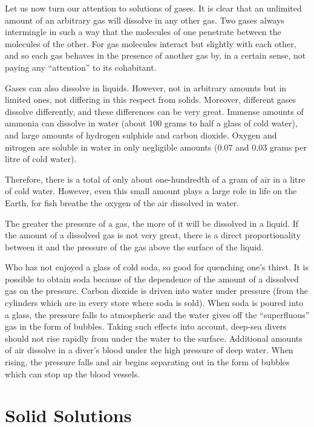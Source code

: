 Let us now turn our attention to solutions of gases. It is clear that an unlimited amount of an arbitrary gas will dissolve in any other gas. Two gases always intermingle in such a way that the molecules of one penetrate between the molecules of the other. For gas molecules interact but slightly with each other, and so each gas behaves in the presence of another gas by, in a certain sense, not paying any ``attention'' to its cohabitant.

Gases can also dissolve in liquids. However, not in arbitrary amounts but in limited ones, not differing in this respect from solids. Moreover, different gases dis­solve differently, and these differences can be very great. Immense amounts of ammonia can dissolve in water (about 100 grams to half a glass of cold water), and large amounts of hydrogen sulphide and carbon dioxide. Oxygen and nitrogen are soluble in water in only negligible amounts (0.07 and 0.03 grams per litre of cold water).

Therefore, there is a total of only about one-hundredth of a gram of air in a litre of cold water. However, even this small amount plays a large role in life on the Earth, for fish breathe the oxygen of the air dissolved in water.

The greater the pressure of a gas, the more of it will be dissolved in a liquid. If the amount of a dissolved gas is not very great, there is a direct proportionality between it and the pressure of the gas above the surface of the liquid.

Who has not enjoyed a glass of cold soda, so good for quenching one's thirst. It is possible to obtain soda because of the dependence of the amount of a dissolved gas on the pressure. Carbon dioxide is driven into water under pressure (from the cylinders which are in every store where soda is sold). When soda is poured into a glass, the pres­sure falls to atmospheric and the water gives off the ``super­fluous'' gas in the form of bubbles.
Taking such effects into account, deep-sea divers should not rise rapidly from under the water to the surface. Addi­tional amounts of air dissolve in a diver’s blood under the high pressure of deep water. When rising, the pressure falls and air begins separating out in the form of bubbles which can stop up the blood vessels.

\section{Solid Solutions}

